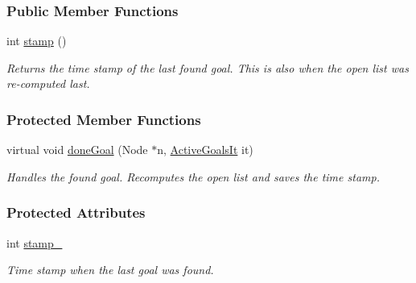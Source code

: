 \subsubsection*{Public Member Functions}
\begin{DoxyCompactItemize}
\item 
int \hyperlink{structslb_1_1ext_1_1policy_1_1goalHandler_1_1TotalUpdateT_a70ad89b79c85a8ff7f5a4dea4efc92d8}{stamp} ()
\begin{DoxyCompactList}\small\item\em Returns the time stamp of the last found goal. This is also when the open list was re-\/computed last. \end{DoxyCompactList}\end{DoxyCompactItemize}
\subsubsection*{Protected Member Functions}
\begin{DoxyCompactItemize}
\item 
virtual void \hyperlink{structslb_1_1ext_1_1policy_1_1goalHandler_1_1TotalUpdateT_aba339d5e3a3e51d7dd0dcdfd8944da96}{done\+Goal} (Node $\ast$n, \hyperlink{structslb_1_1ext_1_1policy_1_1goalHandler_1_1MultipleGoal_a6cbdf80decb53458becf058bbaae6971}{Active\+Goals\+It} it)
\begin{DoxyCompactList}\small\item\em Handles the found goal. Recomputes the open list and saves the time stamp. \end{DoxyCompactList}\end{DoxyCompactItemize}
\subsubsection*{Protected Attributes}
\begin{DoxyCompactItemize}
\item 
int \hyperlink{structslb_1_1ext_1_1policy_1_1goalHandler_1_1TotalUpdateT_abfe77fe4fb050fff931cd494ded16059}{stamp\+\_\+}\hypertarget{structslb_1_1ext_1_1policy_1_1goalHandler_1_1TotalUpdateT_abfe77fe4fb050fff931cd494ded16059}{}\label{structslb_1_1ext_1_1policy_1_1goalHandler_1_1TotalUpdateT_abfe77fe4fb050fff931cd494ded16059}

\begin{DoxyCompactList}\small\item\em Time stamp when the last goal was found. \end{DoxyCompactList}\end{DoxyCompactItemize}


